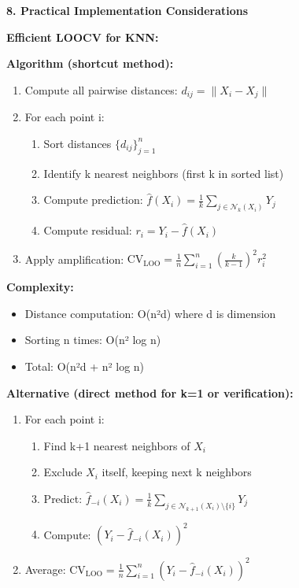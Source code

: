 \documentclass[12pt]{article}
\begin{document}
\begin{explanation}
\textbf{8. Practical Implementation Considerations}

\textbf{Efficient LOOCV for KNN:}

\textbf{Algorithm (shortcut method):}

\begin{enumerate}
    \item Compute all pairwise distances: $d_{ij} = \|X_i - X_j\|$
    \item For each point i:
    \begin{enumerate}
        \item Sort distances $\{d_{ij}\}_{j=1}^n$
        \item Identify k nearest neighbors (first k in sorted list)
        \item Compute prediction: $\hat{f}(X_i) = \frac{1}{k}\sum_{j \in \mathcal{N}_k(X_i)} Y_j$
        \item Compute residual: $r_i = Y_i - \hat{f}(X_i)$
    \end{enumerate}
    \item Apply amplification: $\text{CV}_{\text{LOO}} = \frac{1}{n}\sum_{i=1}^n \left(\frac{k}{k-1}\right)^2 r_i^2$
\end{enumerate}

\textbf{Complexity:}
\begin{itemize}
    \item Distance computation: O(n²d) where d is dimension
    \item Sorting n times: O(n² log n)
    \item Total: O(n²d + n² log n)
\end{itemize}

\textbf{Alternative (direct method for k=1 or verification):}

\begin{enumerate}
    \item For each point i:
    \begin{enumerate}
        \item Find k+1 nearest neighbors of $X_i$
        \item Exclude $X_i$ itself, keeping next k neighbors
        \item Predict: $\hat{f}_{-i}(X_i) = \frac{1}{k}\sum_{j \in \mathcal{N}_{k+1}(X_i) \setminus \{i\}} Y_j$
        \item Compute: $(Y_i - \hat{f}_{-i}(X_i))^2$
    \end{enumerate}
    \item Average: $\text{CV}_{\text{LOO}} = \frac{1}{n}\sum_{i=1}^n (Y_i - \hat{f}_{-i}(X_i))^2$
\end{enumerate}


\end{explanation}
\end{document}
